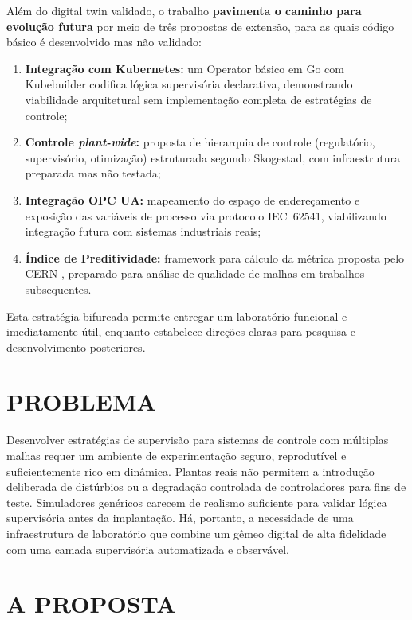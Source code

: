 Além do digital twin validado, o trabalho \textbf{pavimenta o caminho para evolução futura} por meio de três propostas de extensão, para as quais código básico é desenvolvido mas não validado:
\begin{enumerate}
  \item \textbf{Integração com Kubernetes:} um Operator básico em Go com Kubebuilder codifica lógica supervisória declarativa, demonstrando viabilidade arquitetural sem implementação completa de estratégias de controle;
  \item \textbf{Controle \textit{plant-wide}:} proposta de hierarquia de controle (regulatório, supervisório, otimização) estruturada segundo Skogestad, com infraestrutura preparada mas não testada;
  \item \textbf{Integração OPC UA:} mapeamento do espaço de endereçamento e exposição das variáveis de processo via protocolo IEC~62541, viabilizando integração futura com sistemas industriais reais;
  \item \textbf{Índice de Preditividade:} framework para cálculo da métrica proposta pelo CERN \cite{CERN_WEAPL02}, preparado para análise de qualidade de malhas em trabalhos subsequentes.
\end{enumerate}

Esta estratégia bifurcada permite entregar um laboratório funcional e imediatamente útil, enquanto estabelece direções claras para pesquisa e desenvolvimento posteriores.


\section{PROBLEMA}
\label{sec:problema}

Desenvolver estratégias de supervisão para sistemas de controle com múltiplas malhas requer um ambiente de experimentação seguro, reprodutível e suficientemente rico em dinâmica. Plantas reais não permitem a introdução deliberada de distúrbios ou a degradação controlada de controladores para fins de teste. Simuladores genéricos carecem de realismo suficiente para validar lógica supervisória antes da implantação. Há, portanto, a necessidade de uma infraestrutura de laboratório que combine um gêmeo digital de alta fidelidade com uma camada supervisória automatizada e observável.

\section{A PROPOSTA}
\label{sec:proposta}

